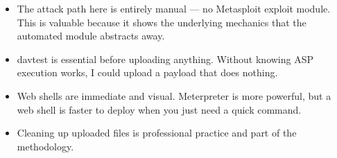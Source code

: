 \begin{takebox}
\begin{itemize}
  \item The attack path here is entirely manual --- no Metasploit exploit module.
        This is valuable because it shows the underlying mechanics that the
        automated module abstracts away.
  \item davtest is essential before uploading anything. Without knowing ASP
        execution works, I could upload a payload that does nothing.
  \item Web shells are immediate and visual. Meterpreter is more powerful, but
        a web shell is faster to deploy when you just need a quick command.
  \item Cleaning up uploaded files is professional practice and part of the
        methodology.
\end{itemize}
\end{takebox}
